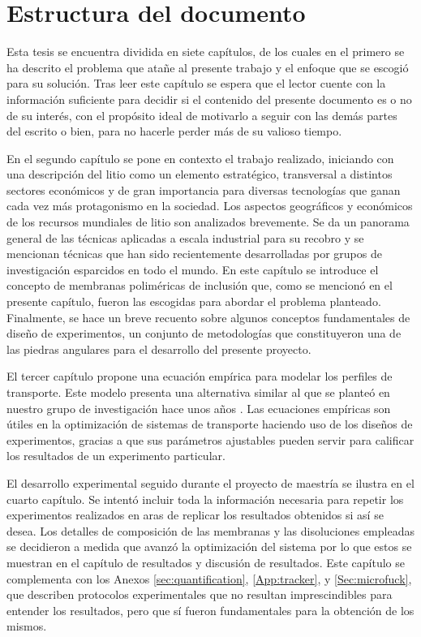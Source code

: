 \section{Estructura del documento}
Esta tesis se encuentra dividida en siete capítulos, de los cuales en el primero se ha descrito el problema que atañe al presente trabajo y el enfoque que se escogió para su solución. Tras leer este capítulo se espera que el lector cuente con la información suficiente para decidir si el contenido del presente documento es o no de su interés, con el propósito ideal de motivarlo a seguir con las demás partes del escrito o bien, para no hacerle perder más de su valioso tiempo.

En el segundo capítulo se pone en contexto el trabajo realizado, iniciando con una descripción del litio como un elemento estratégico, transversal a distintos sectores económicos y de gran importancia para diversas tecnologías que ganan cada vez más protagonismo en la sociedad. Los aspectos geográficos y económicos de los recursos mundiales de litio son analizados brevemente. Se da un panorama general de las técnicas aplicadas a escala industrial para su recobro y se mencionan técnicas que han sido recientemente desarrolladas por grupos de investigación esparcidos en todo el mundo. En este capítulo se introduce el concepto de membranas poliméricas de inclusión que, como se mencionó en el presente capítulo, fueron las escogidas para abordar el problema planteado. Finalmente, se hace un breve recuento sobre algunos conceptos fundamentales de diseño de experimentos, un conjunto de metodologías que constituyeron una de las piedras angulares para el desarrollo del presente proyecto. 

El tercer capítulo propone una ecuación empírica para modelar los perfiles de transporte. Este modelo presenta una alternativa similar al que se planteó en nuestro grupo de investigación hace unos años \citep{RODRIGUEZDESANMIGUEL2014}. Las ecuaciones empíricas son útiles en la optimización de sistemas de transporte haciendo uso de los diseños de experimentos, gracias a que sus parámetros ajustables pueden servir para calificar los resultados de un experimento particular.

El desarrollo experimental seguido durante el proyecto de maestría se ilustra en el cuarto capítulo. Se intentó incluir toda la información necesaria para repetir los experimentos realizados en aras de replicar los resultados obtenidos si así se desea. Los detalles de composición de las membranas y las disoluciones empleadas se decidieron a medida que avanzó la optimización del sistema por lo que estos se muestran en el capítulo de resultados y discusión de resultados. Este capítulo se complementa con los Anexos \ref{sec:quantification}, \ref{App:tracker}, y \ref{Sec:microfuck}, que describen protocolos experimentales que no resultan imprescindibles para entender los resultados, pero que sí fueron fundamentales para la obtención de los mismos.

